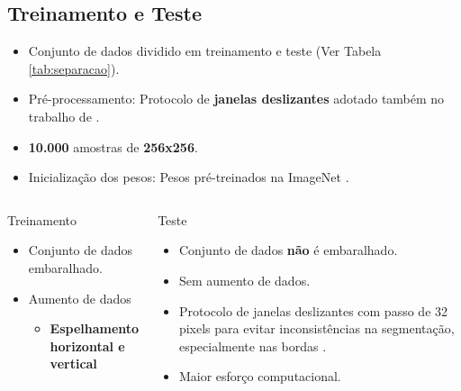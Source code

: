 \documentclass[%
  10pt,%
  aspectratio = 169,%
  compress,%
  t,%
  english,%
  brazilian,%
  tikz,
]{beamer}
\begin{document}
\subsection{Treinamento e Teste}\label{ssec:matmet7}

\begin{frame}
\begin{itemize}
    \item Conjunto de dados dividido em treinamento e teste (Ver Tabela \ref{tab:separacao}).
    \item Pré-processamento: Protocolo de \textbf{janelas deslizantes} adotado também no trabalho de \cite{Andre2021}.
    \item \textbf{10.000} amostras de \textbf{256x256}.
    \item Inicialização dos pesos: Pesos pré-treinados na ImageNet \cite{Imagenet2009}.
\end{itemize}

\begin{columns}[T]

\begin{block}{Treinamento}
    \begin{itemize}
        \item Conjunto de dados embaralhado.
        \item Aumento de dados
        \begin{itemize}
            \item \textbf{Espelhamento horizontal e vertical}
        \end{itemize}
    \end{itemize}
\end{block}

\begin{block}{Teste}
    \begin{itemize}
        \item Conjunto de dados \textbf{não} é embaralhado.
        \item Sem aumento de dados.
        \item Protocolo de janelas deslizantes com passo de 32 pixels para evitar inconsistências na segmentação, especialmente nas bordas \cite{Farhangfar2019}.
        \item Maior esforço computacional.
    \end{itemize}
\end{block}

\end{columns}
\end{frame}
\end{document}
